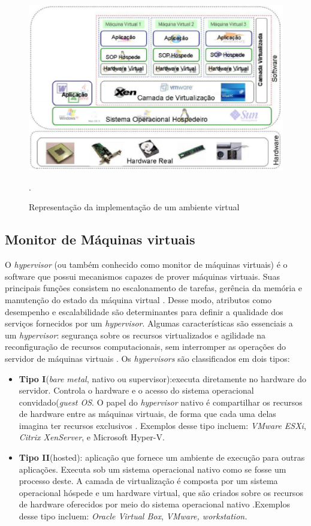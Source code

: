 \begin{figure}[!htb]
\centering
\includegraphics [keepaspectratio=true,scale=0.40]{figuras/virtualization_arc.eps}
\caption{Representação da implementação de um ambiente virtual}
\cite{junior}.
\label{arc_virtualization}
\end{figure} 
 
\subsection{Monitor de Máquinas virtuais}
O \textit{hypervisor} (ou também conhecido como monitor de máquinas virtuais) é o software que possui mecanismos capazes de prover máquinas virtuais. Suas principais funções consistem no escalonamento de tarefas, gerência da memória e manutenção do estado da máquina virtual \cite{manoel}. Desse modo, atributos como desempenho e escalabilidade são determinantes para definir a qualidade dos serviços fornecidos por um \textit{hypervisor}. Algumas características são essenciais a um \textit{hypervisor}: segurança sobre os recursos virtualizados e agilidade na reconfiguração de recursos computacionais, sem interromper as operações do servidor de máquinas virtuais \cite{manoel}. Os \textit{hypervisors} são classificados em dois tipos:

\begin{itemize}
\item \textbf{Tipo I}(\textit{bare metal}, nativo ou supervisor):executa diretamente no hardware do servidor. Controla o hardware e o acesso do sistema operacional convidado(\textit{guest OS}. O papel do \textit{hypervisor} nativo é compartilhar os recursos de hardware entre as máquinas virtuais, de forma que cada uma delas imagina ter recursos exclusivos \cite{manoel}. Exemplos desse tipo incluem: \textit{VMware ESXi}, \textit{Citrix XenServer}, e {Microsoft Hyper-V.}

\item \textbf{Tipo II}(hosted): aplicação que fornece um ambiente de execução para outras aplicações. Executa sob um sistema operacional nativo como se fosse um processo deste. A camada de virtualização é composta por um sistema operacional hóspede e um hardware virtual, que são criados sobre os recursos de hardware oferecidos por meio do sistema operacional nativo \cite{manoel}.Exemplos desse tipo incluem: \textit{Oracle Virtual Box}, \textit{VMware, workstation.}
\end{itemize}

